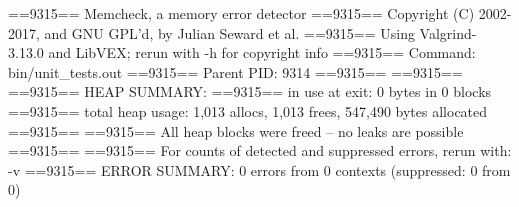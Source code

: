 ==9315== Memcheck, a memory error detector
==9315== Copyright (C) 2002-2017, and GNU GPL'd, by Julian Seward et al.
==9315== Using Valgrind-3.13.0 and LibVEX; rerun with -h for copyright info
==9315== Command: bin/unit_tests.out
==9315== Parent PID: 9314
==9315== 
==9315== 
==9315== HEAP SUMMARY:
==9315==     in use at exit: 0 bytes in 0 blocks
==9315==   total heap usage: 1,013 allocs, 1,013 frees, 547,490 bytes allocated
==9315== 
==9315== All heap blocks were freed -- no leaks are possible
==9315== 
==9315== For counts of detected and suppressed errors, rerun with: -v
==9315== ERROR SUMMARY: 0 errors from 0 contexts (suppressed: 0 from 0)
